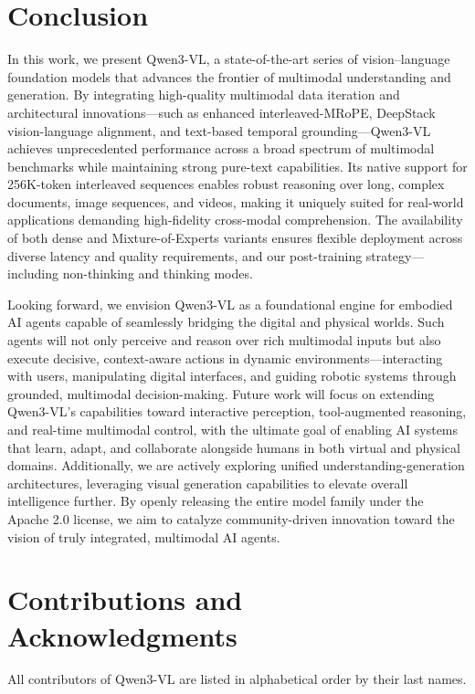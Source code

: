 \documentclass{article} %
\begin{document}
\section{Conclusion}
In this work, we present Qwen3-VL, a state-of-the-art series of vision–language foundation models that advances the frontier of multimodal understanding and generation. By integrating high-quality multimodal data iteration and architectural innovations—such as enhanced interleaved-MRoPE, DeepStack vision-language alignment, and text-based temporal grounding—Qwen3-VL achieves unprecedented performance across a broad spectrum of multimodal benchmarks while maintaining strong pure-text capabilities. Its native support for 256K-token interleaved sequences enables robust reasoning over long, complex documents, image sequences, and videos, making it uniquely suited for real-world applications demanding high-fidelity cross-modal comprehension. The availability of both dense and Mixture-of-Experts variants ensures flexible deployment across diverse latency and quality requirements, and our post-training strategy—including non-thinking and thinking modes.

Looking forward, we envision Qwen3-VL as a foundational engine for embodied AI agents capable of seamlessly bridging the digital and physical worlds. Such agents will not only perceive and reason over rich multimodal inputs but also execute decisive, context-aware actions in dynamic environments—interacting with users, manipulating digital interfaces, and guiding robotic systems through grounded, multimodal decision-making. Future work will focus on extending Qwen3-VL’s capabilities toward interactive perception, tool-augmented reasoning, and real-time multimodal control, with the ultimate goal of enabling AI systems that learn, adapt, and collaborate alongside humans in both virtual and physical domains. Additionally, we are actively exploring unified understanding-generation architectures, leveraging visual generation capabilities to elevate overall intelligence further. By openly releasing the entire model family under the Apache 2.0 license, we aim to catalyze community-driven innovation toward the vision of truly integrated, multimodal AI agents.



\section{Contributions and Acknowledgments}

All contributors of Qwen3-VL are listed in alphabetical order by their last names.
\end{document}
